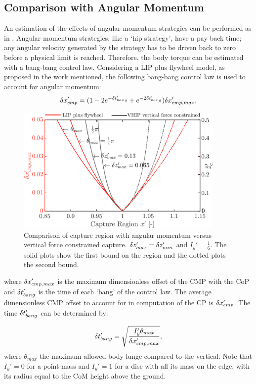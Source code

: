\subsection{Comparison with Angular Momentum}
An estimation of the effects of angular momentum strategies can be performed as in \cite{koolen2012capturability}. Angular momentum strategies, like a `hip strategy', have a pay back time; any angular velocity generated by the strategy has to be driven back to zero before a physical limit is reached. Therefore, the body torque can be estimated with a bang-bang control law.  Considering a \ac{LIP} plus flywheel model, as proposed in the work mentioned, the following bang-bang control law is used to account for angular momentum:
\begin{equation}
\delta x_{cmp}' = (1-2e^{-\delta t_{bang}'}+e^{-2\delta t_{bang}'})\delta x_{cmp,max}',
\end{equation}
\begin{figure}
\centering
\includegraphics[width=0.9\textwidth]{STYLESTUFF/capcompare.png}
\caption{Comparison of capture region with angular momentum versus vertical force constrained capture. $\delta z_{max}' =\delta z_{min}'$ and $I_y' = \frac{1}{6}$. The solid plots show the first bound on the region and the dotted plots the second bound.}
\label{fig:capcompare}
\end{figure}
where $\delta x_{cmp,max}'$ is the maximum dimensionless offset of the \ac{CMP} with the \ac{CoP} and $\delta t_{bang}'$ is the time of each `bang' of the control law. The average dimensionless \ac{CMP} offset to account for in computation of the \ac{CP} is $\delta x_{cmp}'$. The time $\delta t_{bang}'$ can be determined by:

\begin{equation}
\delta t_{bang}' = \sqrt{\frac{I_y'\theta_{max}}{\delta x_{cmp,max}'}},
\end{equation}
where $\theta_{max}$ the maximum allowed body lunge compared to the vertical. Note that $I_y'=0$ for a point-mass and $I_y'=1$ for a disc with all its mass on the edge, with its radius equal to the \ac{CoM} height above the ground. 

